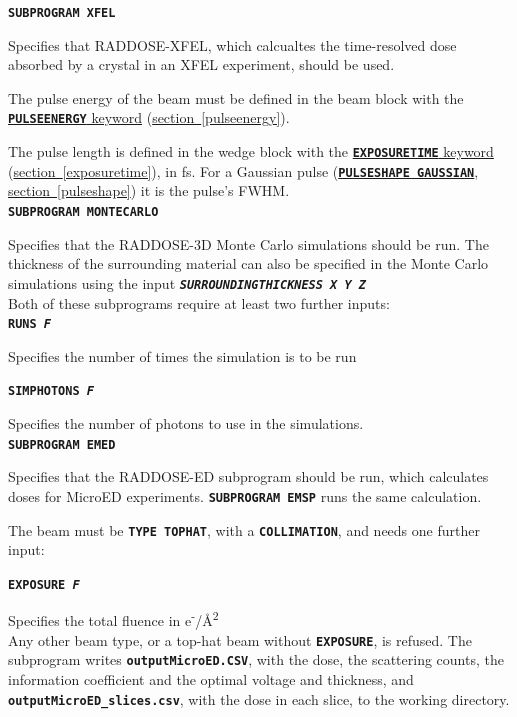 \documentclass[a4paper]{article}
\newcommand{\Keyword}[1]{\texttt{\textbf{#1}}\xspace}
\newcommand{\SB}{\\[0.2em]}
\begin{document}
\noindent \Keyword{SUBPROGRAM XFEL}

Specifies that RADDOSE-XFEL, which calcualtes the time-resolved dose absorbed by a crystal in an XFEL experiment, should be used. 

The pulse energy of the beam must be defined in the beam block with the \hyperref[pulseenergy]{\Keyword{PULSEENERGY} keyword} (\hyperref[pulseenergy]{section~\ref*{pulseenergy}}). 

The pulse length is defined in the wedge block with the \hyperref[exposuretime]{\Keyword{EXPOSURETIME} keyword} (\hyperref[exposuretime]{section~\ref*{exposuretime}}), in fs. For a Gaussian pulse (\hyperref[pulseshape]{\Keyword{PULSESHAPE GAUSSIAN}}, \hyperref[pulseshape]{section~\ref*{pulseshape}}) it is the pulse's FWHM. \SB



\noindent \Keyword{SUBPROGRAM MONTECARLO}

Specifies that the RADDOSE-3D Monte Carlo simulations should be run. The thickness of the surrounding material can also be specified in the Monte Carlo simulations using the input \Keyword{\textit{SURROUNDINGTHICKNESS X Y Z}}\SB

\noindent Both of these subprograms require at least two further inputs: \SB
\noindent \Keyword{RUNS \textit{F}}

Specifies the number of times the simulation is to be run

\noindent \Keyword{SIMPHOTONS \textit{F}}

Specifies the number of photons to use in the simulations. \SB

\noindent \Keyword{SUBPROGRAM EMED}

Specifies that the RADDOSE-ED subprogram should be run, which calculates doses for MicroED experiments. \Keyword{SUBPROGRAM EMSP} runs the same calculation.

The beam must be \Keyword{TYPE TOPHAT}, with a \Keyword{COLLIMATION}, and needs one further input:

\noindent \Keyword{EXPOSURE \textit{F}}
 
Specifies the total fluence in e\textsuperscript{-}/{\AA}\textsuperscript{2}\SB

Any other beam type, or a top-hat beam without \Keyword{EXPOSURE}, is refused. The subprogram writes \Keyword{outputMicroED.CSV}, with the dose, the scattering counts, the information coefficient and the optimal voltage and thickness, and \Keyword{outputMicroED\_slices.csv}, with the dose in each slice, to the working directory.\SB
\end{document}

